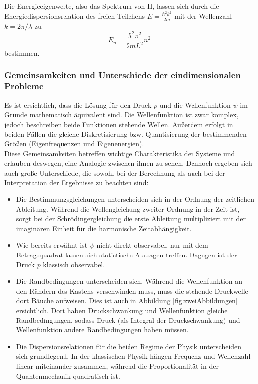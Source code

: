 
Die Energieeigenwerte, also das Spektrum von H, lassen sich durch die Energiedispersionsrelation des freien Teilchens $E = \frac{\hbar^2 k^2}{2m}$ mit der Wellenzahl $k = 2 \pi / \lambda$ zu
\begin{equation}
  E_n = \frac{\hbar^2 \pi^2}{2 m L^2} n^2
  \label{eqn:kastenEnergien}
\end{equation}
bestimmen.

\subsubsection{Gemeinsamkeiten und Unterschiede der eindimensionalen Probleme}
Es ist ersichtlich, dass die Lösung für den Druck $p$ und die Wellenfunktion $\psi$ im Grunde mathematisch äquivalent sind. Die Wellenfunktion ist zwar komplex, jedoch beschreiben beide Funktionen stehende Wellen. Außerdem erfolgt in beiden Fällen die gleiche Diskretisierung bzw. Quantisierung der bestimmenden Größen (Eigenfrequenzen und Eigenenergien).\\
Diese Gemeinsamkeiten betreffen wichtige Charakteristika der Systeme und erlauben deswegen, eine Analogie zwischen ihnen zu sehen. Dennoch ergeben sich auch große Unterschiede, die sowohl bei der Berechnung als auch bei der Interpretation der Ergebnisse zu beachten sind:
\begin{itemize}
  \item Die Bestimmungsgleichungen unterscheiden sich in der Ordnung der zeitlichen Ableitung. Während die Wellengleichung zweiter Ordnung in der Zeit ist, sorgt bei der Schrödingergleichung die erste Ableitung multipliziert mit der imaginären Einheit für die harmonische Zeitabhängigkeit.
  \item Wie bereits erwähnt ist $\psi$ nicht direkt observabel, nur mit dem Betragsquadrat lassen sich statistische Aussagen treffen. Dagegen ist der Druck $p$ klassisch observabel.
  \item Die Randbedingungen unterscheiden sich. Während die Wellenfunktion an den Rändern des Kastens verschwinden muss, muss die stehende Druckwelle dort Bäuche aufweisen. Dies ist auch in Abbildung \ref{fig:zweiAbbildungen} ersichtlich. Dort haben Druckschwankung und Wellenfunktion gleiche Randbedingungen, sodass Druck (als Integral der Druckschwankung) und Wellenfunktion andere Randbedingungen haben müssen.
  \item Die Dispersionsrelationen für die beiden Regime der Physik unterscheiden sich grundlegend. In der klassischen Physik hängen Frequenz und Wellenzahl linear miteinander zusammen, während die Proportionalität in der Quantenmechanik quadratisch ist.
\end{itemize}

